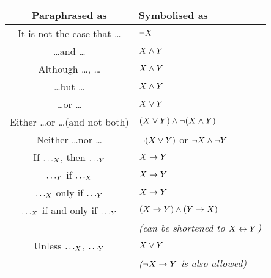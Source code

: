 \begin{tabular}{c|l}
	\textbf{Paraphrased as} & \textbf{Symbolised as}\\[.5em]
	\hline
	It is not the case that \ldots & $\neg X$\\[.4em]
	\ldots and \ldots & $X \mathbin{\wedge} Y$\\[.4em]
	Although \ldots, \ldots & $X \mathbin{\wedge} Y$\\[.4em]
	\ldots but \ldots & $X \mathbin{\wedge} Y$\\[.4em]
	\ldots or \ldots & $X \vee Y$\\[.4em]
	Either \ldots or \ldots (and not both) & $(X \vee Y) \mathbin{\wedge} \neg(X \mathbin{\wedge} Y)$\\[.4em]
	Neither \ldots nor \ldots & $\neg(X \vee Y)$ or $\neg X \mathbin{\wedge} \neg Y$\\[.4em]
	If $\ldots_{X}$, then $\ldots_{Y}$ & $X \rightarrow Y$\\[.4em]
	$\ldots_{Y}$ if $\ldots_{X}$ & $X \rightarrow Y$\\[.4em]
	$\ldots_{X}$ only if $\ldots_{Y}$ & $X \rightarrow Y$\\[.4em]
	$\ldots_{X}$ if and only if $\ldots_{Y}$ & $(X \rightarrow Y)\mathbin{\wedge}(Y\rightarrow X)$\\&\quad \emph{(can be shortened to $X\leftrightarrow Y$)}\\[.4em]
	Unless $\ldots_{X}$, $\ldots_{Y}$ & $X \vee Y$\\&\quad\emph{($\neg X\rightarrow Y$ is also allowed)}\\
\end{tabular}


